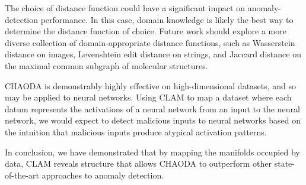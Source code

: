 The choice of distance function could have a significant impact on anomaly-detection performance.
In this case, domain knowledge is likely the best way to determine the distance function of choice.
Future work should explore a more diverse collection of domain-appropriate distance functions, such as Wasserstein distance on images, Levenshtein edit distance on strings, and Jaccard distance on the maximal common subgraph of molecular structures.

CHAODA is demonstrably highly effective on high-dimensional datasets, and so may be applied to neural networks.
Using CLAM to map a dataset where each datum represents the activations of a neural network from an input to the neural network, we would expect to detect malicious inputs to neural networks based on the intuition that malicious inputs produce atypical activation patterns.

In conclusion, we have demonstrated that by mapping the manifolds occupied by data, CLAM reveals structure that allows CHAODA to outperform other state-of-the-art approaches to anomaly detection.
